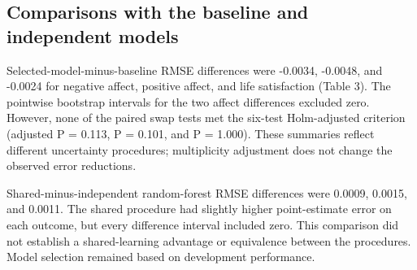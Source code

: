 \documentclass[11pt,letterpaper]{article}
\begin{document}
\FloatBarrier

\subsection{Comparisons with the baseline and independent models}\label{comparisons-with-the-baseline-and-independent-models}

Selected-model-minus-baseline RMSE differences were \mbox{-0.0034}, \mbox{-0.0048}, and \mbox{-0.0024} for negative affect, positive affect, and life satisfaction (Table 3). The pointwise bootstrap intervals for the two affect differences excluded zero. However, none of the paired swap tests met the six-test Holm-adjusted criterion (adjusted P = 0.113, P = 0.101, and P = 1.000). These summaries reflect different uncertainty procedures; multiplicity adjustment does not change the observed error reductions.

Shared-minus-independent random-forest RMSE differences were 0.0009, 0.0015, and 0.0011. The shared procedure had slightly higher point-estimate error on each outcome, but every difference interval included zero. This comparison did not establish a shared-learning advantage or equivalence between the procedures. Model selection remained based on development performance.
\end{document}
